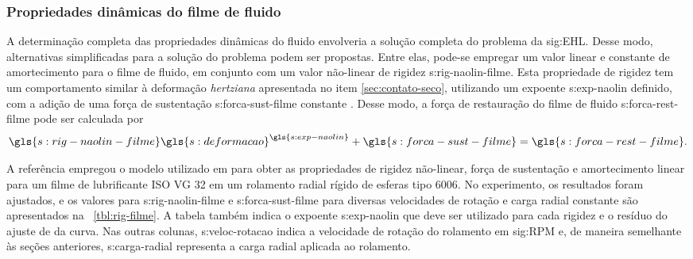 \documentclass[12pt,oneside,english,brazil,lmodern,siglas,simbolos,cite=num]{ucsmonograph}
\begin{document}
	\begin{figure}[t]
		\label{fig:indices-visc-pressao}
	\end{figure}

	\subsubsection{Propriedades dinâmicas do filme de fluido} \label{sec:props-filme-fluido}
	A determinação completa das propriedades dinâmicas do fluido envolveria a solução completa do problema da \gls{sig:EHL}.
	Desse modo, alternativas simplificadas para a solução do problema podem ser propostas.
	Entre elas, pode-se empregar um valor linear e constante de amortecimento para o filme de fluido, em conjunto com um valor não-linear de rigidez \gls{s:rig-naolin-filme}.
	Esta propriedade de rigidez tem um comportamento similar à deformação \emph{hertziana} apresentada no item \ref{sec:contato-seco}, utilizando um expoente \gls{s:exp-naolin} definido, com a adição de uma força de sustentação \gls{s:forca-sust-filme} constante \cite{nonato:2014}.
	Desse modo, a força de restauração do filme de fluido \gls{s:forca-rest-filme} pode ser calculada por
	\begin{equation} \label{eqn:ehl:forca-rest}
		\gls{s:rig-naolin-filme}\gls{s:deformacao}^{\gls{s:exp-naolin}} +
		\gls{s:forca-sust-filme} = \gls{s:forca-rest-filme}.
	\end{equation}
	
	A referência \cite{nonato:2014} empregou o modelo utilizado em \cite{nonato:2010} para obter as propriedades de rigidez não-linear, força de sustentação e amortecimento linear para um filme de lubrificante ISO VG 32 em um rolamento radial rígido de esferas tipo 6006.
	No experimento, os resultados foram ajustados, e os valores para \gls{s:rig-naolin-filme} e \gls{s:forca-sust-filme} para diversas velocidades de rotação e carga radial constante são apresentados na \tablename\ \ref{tbl:rig-filme}.
	A tabela também indica o expoente \gls{s:exp-naolin} que deve ser utilizado para cada rigidez e o resíduo do ajuste de da curva.
	Nas outras colunas, \gls{s:veloc-rotacao} indica a velocidade de rotação do rolamento em \gls{sig:RPM} e, de maneira semelhante às seções anteriores, \gls{s:carga-radial} representa a carga radial aplicada ao rolamento.	
	
\end{document}
